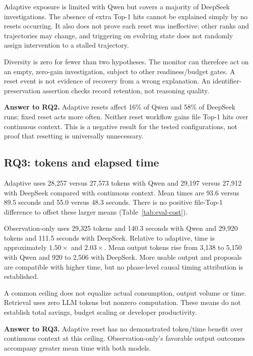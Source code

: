 Adaptive exposure is limited with Qwen but covers a majority of DeepSeek investigations. The absence of extra Top-1 hits cannot be explained simply by no resets occurring. It also does not prove each reset was ineffective: other ranks and trajectories may change, and triggering on evolving state does not randomly assign intervention to a stalled trajectory.

Diversity is zero for fewer than two hypotheses. The monitor can therefore act on an empty, zero-gain investigation, subject to other readiness/budget gates. A reset event is not evidence of recovery from a wrong explanation. An identifier-preservation assertion checks record retention, not reasoning quality.

\noindent\textbf{Answer to RQ2.} Adaptive resets affect 16\% of Qwen and 58\% of DeepSeek runs; fixed reset acts more often. Neither reset workflow gains file Top-1 hits over continuous context. This is a negative result for the tested configurations, not proof that resetting is universally unnecessary.

\subsection{RQ3: tokens and elapsed time}\label{sec:rq3}
Adaptive uses 28,257 versus 27,573 tokens with Qwen and 29,197 versus 27,912 with DeepSeek compared with continuous context. Mean times are 93.6 versus 89.5 seconds and 55.0 versus 48.3 seconds. There is no positive file-Top-1 difference to offset these larger means (Table~\ref{tab:eval-cost}).


Observation-only uses 29,325 tokens and 140.3 seconds with Qwen and 29,920 tokens and 111.5 seconds with DeepSeek. Relative to adaptive, time is approximately $1.50\times$ and $2.03\times$. Mean output tokens rise from 3,138 to 5,150 with Qwen and 920 to 2,506 with DeepSeek. More usable output and proposals are compatible with higher time, but no phase-level causal timing attribution is established.

A common ceiling does not equalize actual consumption, output volume or time. Retrieval uses zero LLM tokens but nonzero computation. These means do not establish total savings, budget scaling or developer productivity.

\noindent\textbf{Answer to RQ3.} Adaptive reset has no demonstrated token/time benefit over continuous context at this ceiling. Observation-only's favorable output outcomes accompany greater mean time with both models.

